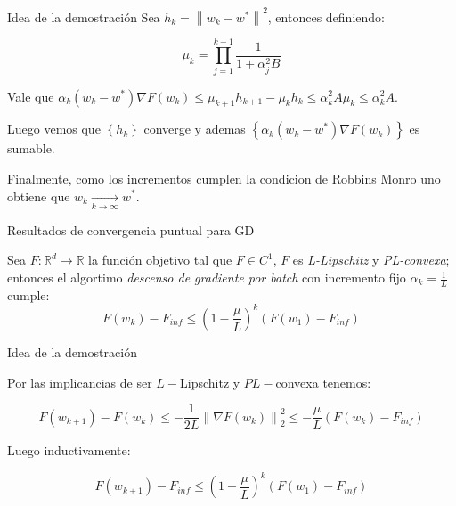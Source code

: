 \documentclass{beamer}
\newcommand{\R}{{\mathbb{R}}}
\newcommand{\norm}[1]{\left\lVert#1\right\rVert}
\newcommand{\sett}[1]{\left\lbrace#1\right\rbrace}
\newcommand{\underlimitinf}[1]{\xrightarrow[#1 \rightarrow \infty]{}}
\begin{document}
\begin{frame}{Idea de la demostraci\'on}
Sea $h_k = \norm{w_k - w^*}^2$, entonces definiendo:

\begin{subequations}
	\begin{equation*}
	\mu_k = \prod\limits_{j=1}^{k-1} {\dfrac{1}{1 + \alpha_j^2B}}
	\end{equation*}
\end{subequations}

Vale que $\alpha_k \left(w_k - w^* \right)\nabla F(w_k) \leq \mu_{k+1}h_{k+1}- \mu_{k}h_{k} \leq \alpha_k^2 A \mu_k \leq \alpha_k^2 A$.  


\pause
\smallskip

Luego vemos que $\sett{h_k}$ converge y ademas $\sett{\alpha_k \left(w_k - w^* \right)\nabla F(w_k)}$ es sumable.


Finalmente, como los incrementos cumplen la condicion de Robbins Monro uno obtiene que $w_k \underlimitinf{k} w^*$.

\end{frame}

\begin{frame}{Resultados de convergencia puntual para GD}

\begin{theorem}
	Sea $F: \R^d \rightarrow \R$ la funci\'on objetivo tal que $F \in C^1$, $F$ es \textit{L-Lipschitz} y \textit{PL-convexa}; entonces el algortimo \textit{descenso de gradiente por batch} con incremento fijo $\alpha_k = \frac{1}{L}$ cumple:
	\begin{equation*}
	F(w_k) - F_{inf} \leq \left(1 - \frac{\mu}{L}\right)^k \left(F(w_1) - F_{inf}\right)
	\end{equation*}
\end{theorem}

\end{frame}

\begin{frame}{Idea de la demostraci\'on}

Por las implicancias de ser $L-$Lipschitz y $PL-$convexa tenemos:

\begin{equation*}
F(w_{k+1}) - F(w_k) \leq -\frac{1}{2L} \norm{\nabla F(w_k)}_2^2 \leq - \frac{\mu}{L} \left(F(w_k) - F_{inf}\right)
\end{equation*}

Luego inductivamente:

\begin{equation*}
F(w_{k+1}) - F_{inf} \leq \left(1 - \frac{\mu}{L}\right)^k \left(F(w_1) - F_{inf}\right)
\end{equation*}

\end{frame}
\end{document}
